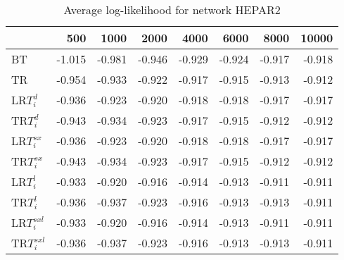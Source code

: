 \begin{table}
 \begin{center}
 \begin{tabular}{lrrrrrrr}
 & 500 & 1000 & 2000 & 4000 & 6000 & 8000 & 10000\\\hline
BT & -1.015 & -0.981 & -0.946 & -0.929 & -0.924 & -0.917 & -0.918\\\hline
TR & -0.954 & -0.933 & -0.922 & -0.917 & -0.915 & -0.913 & -0.912\\\hline
LR$T_i^d$ & -0.936 & -0.923 & -0.920 & -0.918 & -0.918 & -0.917 & -0.917\\\hline
TR$T_i^d$ & -0.943 & -0.934 & -0.923 & -0.917 & -0.915 & -0.912 & -0.912\\\hline
LR$T_i^{sx}$ & -0.936 & -0.923 & -0.920 & -0.918 & -0.918 & -0.917 & -0.917\\\hline
TR$T_i^{sx}$ & -0.943 & -0.934 & -0.923 & -0.917 & -0.915 & -0.912 & -0.912\\\hline
LR$T_i^l$ & -0.933 & -0.920 & -0.916 & -0.914 & -0.913 & -0.911 & -0.911\\\hline
TR$T_i^l$ & -0.936 & -0.937 & -0.923 & -0.916 & -0.913 & -0.913 & -0.911\\\hline
LR$T_i^{sxl}$ & -0.933 & -0.920 & -0.916 & -0.914 & -0.913 & -0.911 & -0.911\\\hline
TR$T_i^{sxl}$ & -0.936 & -0.937 & -0.923 & -0.916 & -0.913 & -0.913 & -0.911\\\hline
\end{tabular}
\end{center}
\caption{Average log-likelihood for network HEPAR2 }
\label{Hepar2ll}
\end{table}


